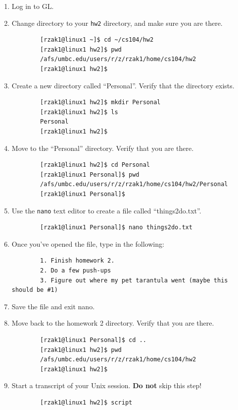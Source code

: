 \documentclass[letter,11pt]{article}
\begin{document}
\begin{enumerate}
    \item Log in to GL.
    \item Change directory to your \texttt{hw2} directory, and make sure you are there.
    \begin{verbatim}
        [rzak1@linux1 ~]$ cd ~/cs104/hw2
        [rzak1@linux1 hw2]$ pwd
        /afs/umbc.edu/users/r/z/rzak1/home/cs104/hw2
        [rzak1@linux1 hw2]$\end{verbatim}
    \item Create a new directory called ``Personal''. Verify that the directory exists.
    \begin{verbatim}
        [rzak1@linux1 hw2]$ mkdir Personal
        [rzak1@linux1 hw2]$ ls
        Personal
        [rzak1@linux1 hw2]$\end{verbatim}
    \item Move to the ``Personal'' directory. Verify that you are there.
    \begin{verbatim}
        [rzak1@linux1 hw2]$ cd Personal
        [rzak1@linux1 Personal]$ pwd
        /afs/umbc.edu/users/r/z/rzak1/home/cs104/hw2/Personal
        [rzak1@linux1 Personal]$\end{verbatim}
    \item Use the \texttt{nano} text editor to create a file called ``things2do.txt''.
    \begin{verbatim}
        [rzak1@linux1 Personal]$ nano things2do.txt\end{verbatim}
    \item Once you've opened the file, type in the following:
    \begin{verbatim}
        1. Finish homework 2.
        2. Do a few push-ups
        3. Figure out where my pet tarantula went (maybe this should be #1)\end{verbatim}
    \item Save the file and exit nano.
    \item Move back to the homework 2 directory. Verify that you are there.
    \begin{verbatim}
        [rzak1@linux1 Personal]$ cd ..
        [rzak1@linux1 hw2]$ pwd
        /afs/umbc.edu/users/r/z/rzak1/home/cs104/hw2
        [rzak1@linux1 hw2]$\end{verbatim}
    \item Start a transcript of your Unix session. \textbf{Do not} skip this step!
    \begin{verbatim}
        [rzak1@linux1 hw2]$ script

\end{verbatim}
\end{enumerate}
\end{document}
